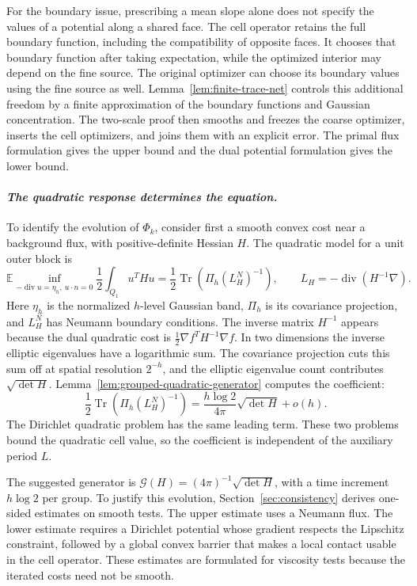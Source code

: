 \documentclass{smfart}
\theoremstyle{definition}
\newcommand{\1}{\mathbf 1}
\begin{document}
For the boundary issue, prescribing a mean slope alone does not specify
the values of a potential along a shared face.  The cell operator retains
the full boundary function, including the compatibility of opposite
faces.  It chooses that boundary function after taking expectation, while
the optimized interior may depend on the fine source.  The original
optimizer can choose its boundary values using the fine source as well.
Lemma~\ref{lem:finite-trace-net} controls this additional freedom by a
finite approximation of the boundary functions and Gaussian concentration.
The two-scale proof then smooths and freezes the coarse optimizer, inserts
the cell optimizers, and joins them with an explicit error.  The primal
flux formulation gives the upper bound and the dual potential formulation
gives the lower bound.

\smallskip
\paragraph{\textit{The quadratic response determines the equation.}}
To identify the evolution of $\Phi_k$, consider first a smooth convex cost
near a background flux, with positive-definite Hessian $H$.  The
quadratic model for a unit outer block is
\[
\mathbb E\inf_{-\operatorname{div}u=\eta_h,\ u\cdot n=0}
\frac12\int_{Q_1}u^THu
=\frac12\operatorname{Tr}\!\left(\Pi_h(L_H^N)^{-1}\right),
\qquad L_H=-\operatorname{div}(H^{-1}\nabla).
\]
Here $\eta_h$ is the normalized $h$-level Gaussian band, $\Pi_h$ is its
covariance projection, and $L_H^N$ has Neumann boundary conditions.
The inverse matrix $H^{-1}$ appears because the dual quadratic cost is
$\frac12\nabla f^TH^{-1}\nabla f$.
In two dimensions the inverse elliptic eigenvalues have a logarithmic
sum.  The covariance projection cuts this sum off at spatial resolution
$2^{-h}$, and the elliptic eigenvalue count contributes
$\sqrt{\det H}$.  Lemma~\ref{lem:grouped-quadratic-generator} computes
the coefficient:
\[
\frac12\operatorname{Tr}\!\left(\Pi_h(L_H^N)^{-1}\right)
=\frac{h\log2}{4\pi}\sqrt{\det H}+o(h).
\]
The Dirichlet quadratic problem has the same leading term.  These two
problems bound the quadratic cell value, so the coefficient is independent
of the auxiliary period $L$.

The suggested generator is $\mathcal G(H)=(4\pi)^{-1}\sqrt{\det H}$,
with a time increment $h\log2$ per group.  To justify this evolution,
Section~\ref{sec:consistency} derives one-sided estimates
on smooth tests.  The upper estimate uses a Neumann flux.  The lower
estimate requires a Dirichlet potential whose gradient respects the
Lipschitz constraint, followed by a global convex barrier that makes a
local contact usable in the cell operator.  These estimates are formulated
for viscosity tests because the iterated costs need not be smooth.
\end{document}
